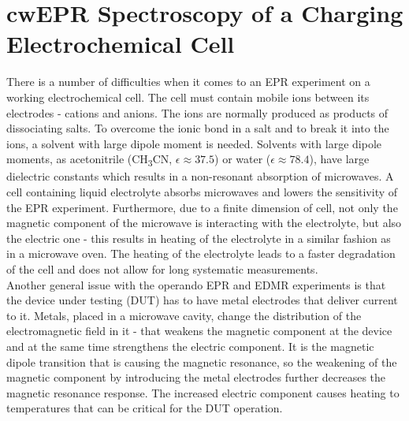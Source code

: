 \section{cwEPR Spectroscopy of a Charging Electrochemical Cell}
There is a number of difficulties when it comes to an EPR experiment on a working electrochemical cell. The cell must contain mobile ions between its electrodes - cations and anions. The ions are normally produced as products of dissociating salts. To overcome the ionic bond in a salt and to break it into the ions, a solvent with large dipole moment is needed. Solvents with large dipole moments, as acetonitrile (CH\textsubscript{3}CN, $\epsilon\approx 37.5$) or water ($\epsilon\approx78.4$), have large dielectric constants which results in a non-resonant absorption of microwaves. A cell containing liquid electrolyte absorbs microwaves and lowers the sensitivity of the EPR experiment. Furthermore, due to a finite dimension of cell, not only the magnetic component of the microwave is interacting with the electrolyte, but also the electric one - this results in heating of the electrolyte in a similar fashion as in a microwave oven. The heating of the electrolyte leads to a faster degradation of the cell and does not allow for long systematic measurements.\\
Another general issue with the operando EPR and EDMR experiments is that the device under testing (DUT) has to have metal electrodes that deliver current to it. Metals, placed in a microwave cavity, change the distribution of the electromagnetic field in it - that weakens the magnetic component at the device and at the same time strengthens the electric component. It is the magnetic dipole transition that is causing the magnetic resonance, so the weakening of the magnetic component by introducing the metal electrodes further decreases the magnetic resonance response. The increased electric component causes heating to temperatures that can be critical for the DUT operation.

